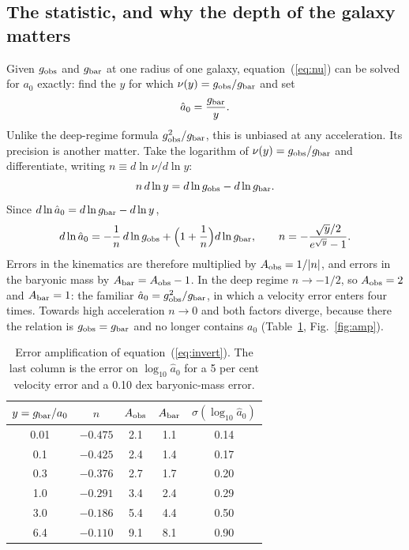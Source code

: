\documentclass[fleqn,usenatbib]{mnras}
\begin{document}
\subsection{The statistic, and why the depth of the galaxy matters}
\label{sec:amp}
Given $g_{\rm obs}$ and $g_{\rm bar}$ at one radius of one galaxy, equation~(\ref{eq:nu}) can be solved for $a_0$ exactly: find the $y$ for which $\nu(y)=g_{\rm obs}/g_{\rm bar}$ and set
\begin{equation}
\hat a_0=\frac{g_{\rm bar}}{y} .
\label{eq:invert}
\end{equation}
Unlike the deep-regime formula $g_{\rm obs}^2/g_{\rm bar}$, this is unbiased at any acceleration. Its precision is another matter. Take the logarithm of $\nu(y)=g_{\rm obs}/g_{\rm bar}$ and differentiate, writing $n\equiv d\ln\nu/d\ln y$:
\begin{equation}
n\,d\ln y=d\ln g_{\rm obs}-d\ln g_{\rm bar} .
\end{equation}
Since $d\ln\hat a_0=d\ln g_{\rm bar}-d\ln y$,
\begin{equation}
d\ln\hat a_0=-\frac1n\,d\ln g_{\rm obs}+\Big(1+\frac1n\Big)d\ln g_{\rm bar},\qquad n=-\frac{\sqrt y/2}{e^{\sqrt y}-1} .
\label{eq:amp}
\end{equation}
Errors in the kinematics are therefore multiplied by $A_{\rm obs}=1/|n|$, and errors in the baryonic mass by $A_{\rm bar}=A_{\rm obs}-1$. In the deep regime $n\to-1/2$, so $A_{\rm obs}=2$ and $A_{\rm bar}=1$: the familiar $\hat a_0=g_{\rm obs}^2/g_{\rm bar}$, in which a velocity error enters four times. Towards high acceleration $n\to0$ and both factors diverge, because there the relation is $g_{\rm obs}=g_{\rm bar}$ and no longer contains $a_0$ (Table~\ref{tab:amp}, Fig.~\ref{fig:amp}).

\begin{table}
\caption{Error amplification of equation~(\ref{eq:invert}). The last column is the error on $\log_{10}\hat a_0$ for a 5 per cent velocity error and a 0.10 dex baryonic-mass error.}
\label{tab:amp}
\begin{tabular}{ccccc}
\toprule
$y=g_{\rm bar}/a_0$ & $n$ & $A_{\rm obs}$ & $A_{\rm bar}$ & $\sigma(\log_{10}\hat a_0)$\\
\midrule
0.01 & $-0.475$ & 2.1 & 1.1 & 0.14\\
0.1 & $-0.425$ & 2.4 & 1.4 & 0.17\\
0.3 & $-0.376$ & 2.7 & 1.7 & 0.20\\
1.0 & $-0.291$ & 3.4 & 2.4 & 0.29\\
3.0 & $-0.186$ & 5.4 & 4.4 & 0.50\\
6.4 & $-0.110$ & 9.1 & 8.1 & 0.90\\
\bottomrule
\end{tabular}
\end{table}
\end{document}
